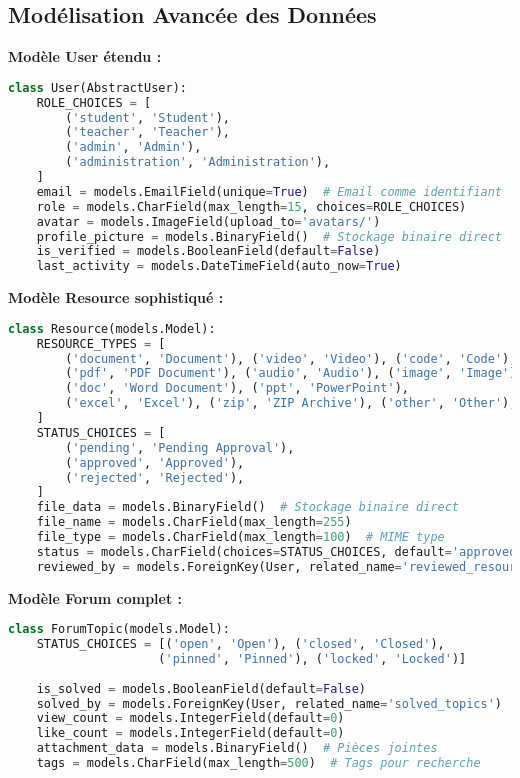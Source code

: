 \documentclass[12pt,a4paper]{article}
\begin{document}
\subsection{Modélisation Avancée des Données}

\textbf{Modèle User étendu :}
\begin{lstlisting}[language=Python]
class User(AbstractUser):
    ROLE_CHOICES = [
        ('student', 'Student'),
        ('teacher', 'Teacher'), 
        ('admin', 'Admin'),
        ('administration', 'Administration'),
    ]
    email = models.EmailField(unique=True)  # Email comme identifiant
    role = models.CharField(max_length=15, choices=ROLE_CHOICES)
    avatar = models.ImageField(upload_to='avatars/')
    profile_picture = models.BinaryField()  # Stockage binaire direct
    is_verified = models.BooleanField(default=False)
    last_activity = models.DateTimeField(auto_now=True)
\end{lstlisting}

\textbf{Modèle Resource sophistiqué :}
\begin{lstlisting}[language=Python]
class Resource(models.Model):
    RESOURCE_TYPES = [
        ('document', 'Document'), ('video', 'Video'), ('code', 'Code'),
        ('pdf', 'PDF Document'), ('audio', 'Audio'), ('image', 'Image'),
        ('doc', 'Word Document'), ('ppt', 'PowerPoint'), 
        ('excel', 'Excel'), ('zip', 'ZIP Archive'), ('other', 'Other'),
    ]
    STATUS_CHOICES = [
        ('pending', 'Pending Approval'),
        ('approved', 'Approved'), 
        ('rejected', 'Rejected'),
    ]
    file_data = models.BinaryField()  # Stockage binaire direct
    file_name = models.CharField(max_length=255)
    file_type = models.CharField(max_length=100)  # MIME type
    status = models.CharField(choices=STATUS_CHOICES, default='approved')
    reviewed_by = models.ForeignKey(User, related_name='reviewed_resources')
\end{lstlisting}

\textbf{Modèle Forum complet :}
\begin{lstlisting}[language=Python]
class ForumTopic(models.Model):
    STATUS_CHOICES = [('open', 'Open'), ('closed', 'Closed'), 
                     ('pinned', 'Pinned'), ('locked', 'Locked')]
    
    is_solved = models.BooleanField(default=False)
    solved_by = models.ForeignKey(User, related_name='solved_topics')
    view_count = models.IntegerField(default=0)
    like_count = models.IntegerField(default=0)
    attachment_data = models.BinaryField()  # Pièces jointes
    tags = models.CharField(max_length=500)  # Tags pour recherche
\end{lstlisting}
\end{document}
